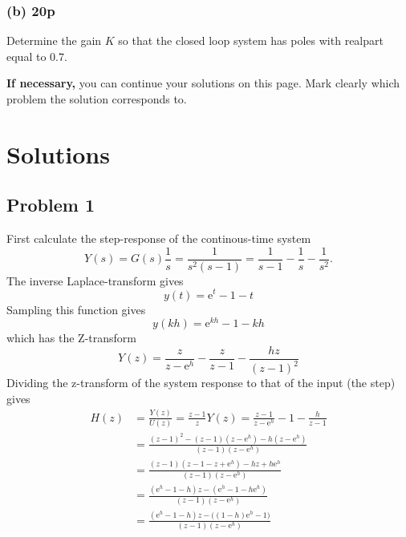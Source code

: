 \documentclass[a4paper,12pt]{article}
\newcommand{\bmpl}{\begin{minipage}[t]{140mm}}
\newcommand{\emp}{\end{minipage}}
\newcommand*{\mexp}[1]{\ensuremath{\mathrm{e}^{#1}}}
\begin{document}
\clearpage
\subsubsection*{(b) 20p}

Determine the gain $K$ so that the closed loop system has poles with realpart equal to $0.7$.


\noindent
\fbox{
\bmpl
{\bf Solution:}\\
\vspace*{150mm}
\emp}

\cleardoublepage

\noindent
{\bf If necessary,} you can continue your solutions on this page. Mark clearly which problem the solution corresponds to.



\newpage
\setcounter{page}{1}

\section*{Solutions}
\subsection*{Problem 1}
   First calculate the step-response of the continous-time system
   \[Y(s) = G(s)\frac{1}{s} = \frac{1}{s^2(s-1)} = \frac{1}{s-1} - \frac{1}{s} - \frac{1}{s^2}.\]
   The inverse Laplace-transform gives
   \[ y(t) = \mexp{t} - 1 - t\]
   Sampling this function gives
   \[ y(kh) = \mexp{kh} -1 - kh\]
   which has the Z-transform
   \[Y(z) = \frac{z}{z - \mexp{h}} - \frac{z}{z-1} - \frac{hz}{(z-1)^2}\]
   Dividing the z-transform of the system response to that of the input (the step) gives
   \begin{align*}
   H(z) &= \frac{Y(z)}{U(z)} = \frac{z-1}{z}Y(z) = \frac{z-1}{z-\mexp{h}} - 1 - \frac{h}{z-1}\\
        &= \frac{(z-1)^2 - (z-1)(z-\mexp{h}) - h(z-\mexp{h})}{(z-1)(z-\mexp{h})}\\
	&= \frac{(z-1)(z-1 -z + \mexp{h}) - hz + h\mexp{h}}{(z-1)(z-\mexp{h})}\\
        &= \frac{ (\mexp{h} - 1 -h)z - (\mexp{h}-1-h\mexp{h})}{(z-1)(z-\mexp{h})}\\
        &= \frac{ (\mexp{h} - 1 -h)z - \big( (1-h)\mexp{h}-1\big)}{(z-1)(z-\mexp{h})}\\
   \end{align*}
\end{document}
